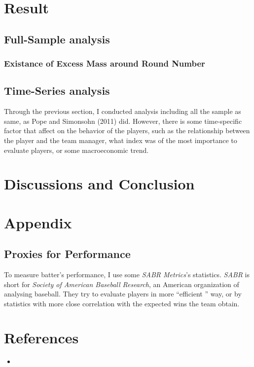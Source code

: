 \documentclass[dvipdfmx, 12pt]{article}
\begin{document}
\section{Result}

 \subsection{Full-Sample analysis}
  \subsubsection{Existance of Excess Mass around Round Number}



 \subsection{Time-Series analysis}

 Through the previous section, I conducted analysis including
 all the sample as same, as Pope and Simonsohn (2011) did.
 However, there is some time-specific factor that affect on
 the behavior of the players, such as the relationship
 between the player and the team manager, what index
 was of the most importance to evaluate players, or some
 macroeconomic trend.



\section{Discussions and Conclusion}



\section{Appendix}

\subsection{Proxies for Performance}

To measure batter's performance, I use some \textit{SABR
Metrics}'s statistics. \textit{SABR} is short for \textit{Society
of American Baseball Research}, an American organization of
analysing baseball. They try to evaluate players in more ``efficient ''
way,  or by statistics with more close correlation with the
expected wins the team obtain.

\section{References}
\small
\begin{itemize}
  \item
\end{itemize}
\end{document}
